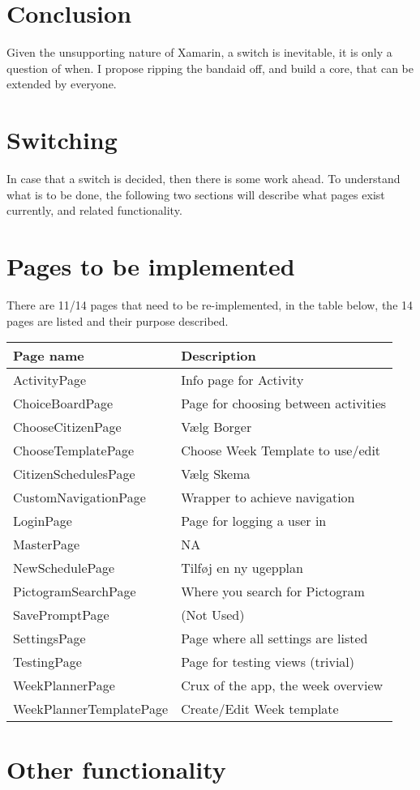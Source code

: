 \section{Conclusion}

Given the unsupporting nature of Xamarin, a switch is inevitable, it is
only a question of when. I propose ripping the bandaid off, and build a
core, that can be extended by everyone.

\section{Switching}

In case that a switch is decided, then there is some work ahead. To
understand what is to be done, the following two sections will describe
what pages exist currently, and related functionality.

\section{Pages to be implemented}

There are 11/14 pages that need to be re-implemented, in the table
below, the 14 pages are listed and their purpose described.

\begin{longtable}[]{@{}ll@{}}
\toprule
Page name & Description\tabularnewline
\midrule
\endhead
ActivityPage & Info page for Activity\tabularnewline
ChoiceBoardPage ~ & Page for choosing between activities\tabularnewline
ChooseCitizenPage & Vælg Borger\tabularnewline
ChooseTemplatePage & Choose Week Template to use/edit\tabularnewline
CitizenSchedulesPage & Vælg Skema\tabularnewline
CustomNavigationPage & Wrapper to achieve navigation\tabularnewline
LoginPage & Page for logging a user in\tabularnewline
MasterPage & NA\tabularnewline
NewSchedulePage & Tilføj en ny ugepplan\tabularnewline
PictogramSearchPage & Where you search for Pictogram\tabularnewline
SavePromptPage & (Not Used)\tabularnewline
SettingsPage & Page where all settings are listed\tabularnewline
TestingPage & Page for testing views (trivial)\tabularnewline
WeekPlannerPage & Crux of the app, the week overview\tabularnewline
WeekPlannerTemplatePage & Create/Edit Week template\tabularnewline
\bottomrule
\end{longtable}

\section{Other functionality}

